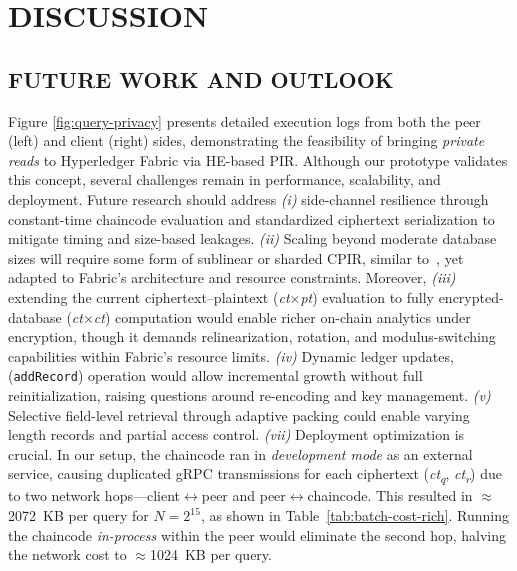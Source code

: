 \documentclass[letterpaper,journal]{IEEEtran}
\begin{document}
\section{DISCUSSION}\label{sec:discussion}
\subsection{FUTURE WORK AND OUTLOOK}
Figure \ref{fig:query-privacy} presents detailed execution logs from both the peer (left) and client (right) sides,
demonstrating the feasibility of bringing \emph{private reads} to Hyperledger Fabric via HE-based PIR.
Although our prototype validates this concept, several challenges remain in performance, scalability, and deployment.
Future research should address \emph{(i)} side-channel resilience through constant-time chaincode evaluation and standardized 
ciphertext serialization to mitigate timing and size-based leakages. 
\emph{(ii)} Scaling beyond moderate database sizes will require some form of sublinear or sharded CPIR, 
similar to~\cite{simplepir_2023,piano_pir_2024,hintless_pir_2024,ypir_2024}, yet adapted to Fabric’s architecture and resource constraints.
Moreover, \emph{(iii)} extending the current ciphertext–plaintext (\emph{ct}×\emph{pt}) evaluation to fully encrypted-database (\emph{ct}×\emph{ct}) 
computation would enable richer on-chain analytics under encryption, though it demands relinearization, rotation, and modulus-switching 
capabilities within Fabric’s resource limits. 
\emph{(iv)} Dynamic ledger updates, (\texttt{addRecord}) operation would allow incremental growth without full reinitialization,
raising questions around re-encoding and key management. 
\emph{(v)} Selective field-level retrieval through adaptive packing could enable varying length records and partial access control.
\emph{(vii)} Deployment optimization is crucial. In our setup, the chaincode ran in \emph{development mode} as an external service, 
causing duplicated gRPC transmissions for each ciphertext (\emph{ct\textsubscript{q}}, \emph{ct\textsubscript{r}}) due to two network 
hops—client$\leftrightarrow$peer and peer$\leftrightarrow$chaincode. This resulted in $\approx$2072~KB per query for $N=2^{15}$, 
as shown in Table~\ref{tab:batch-cost-rich}. Running the chaincode \emph{in-process} within the peer would eliminate the second hop, 
halving the network cost to $\approx$1024~KB per query.
\end{document}
